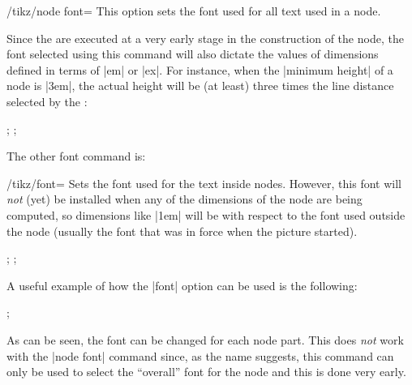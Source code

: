 \begin{key}{/tikz/node font=}
    This option sets the font used for all text used in a node.
\begin{codeexample}[]
\end{codeexample}
    Since the  are executed at a very early stage in the
    construction of the node, the font selected using this command will also
    dictate the values of dimensions defined in terms of |em| or |ex|. For
    instance, when the |minimum height| of a node is |3em|, the actual height
    will be (at least) three times the line distance selected by the :
\begin{codeexample}[]
\tikz {};
\tikz {};
\end{codeexample}
\end{key}

The other font command is:
%
\begin{key}{/tikz/font=}
    Sets the font used for the text inside nodes. However, this font will
    \emph{not} (yet) be installed when any of the dimensions of the node are
    being computed, so dimensions like |1em| will be with respect to the font
    used outside the node (usually the font that was in force when the picture
    started).
\begin{codeexample}[]
\end{codeexample}

\begin{codeexample}[]
\tikz {};
\tikz {};
\end{codeexample}

    A useful example of how the |font| option can be used is the following:
\begin{codeexample}[preamble={\usetikzlibrary{shapes.multipart}}]
\tikz [every text node part/.style={font=\itshape},
       every lower node part/.style={font=\footnotesize}]
  ;
\end{codeexample}

    As can be seen, the font can be changed for each node part. This does
    \emph{not} work with the |node font| command since, as the name suggests,
    this command can only be used to select the ``overall'' font for the node
    and this is done very early.
\end{key}


